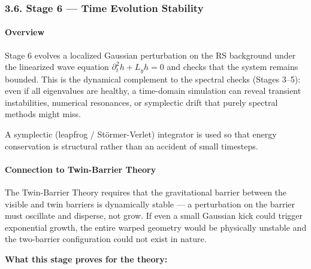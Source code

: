 \documentclass[
  11pt,
]{article}
\begin{document}
\bigskip

\hypertarget{stage-6-time-evolution-stability}{%
\subsubsection{3.6. Stage 6 --- Time Evolution
Stability}\label{stage-6-time-evolution-stability}}

\hypertarget{overview-5}{%
\paragraph{Overview}\label{overview-5}}

Stage 6 evolves a localized Gaussian perturbation on the RS background
under the linearized wave equation \(\partial_t^2 h + L_y h = 0\) and
checks that the system remains bounded. This is the dynamical complement
to the spectral checks (Stages 3--5): even if all eigenvalues are
healthy, a time-domain simulation can reveal transient instabilities,
numerical resonances, or symplectic drift that purely spectral methods
might miss.

A symplectic (leapfrog / Störmer-Verlet) integrator is used so that
energy conservation is structural rather than an accident of small
timesteps.

\bigskip

\hypertarget{connection-to-twin-barrier-theory-5}{%
\paragraph{Connection to Twin-Barrier
Theory}\label{connection-to-twin-barrier-theory-5}}

The Twin-Barrier Theory requires that the gravitational barrier between
the visible and twin barriers is dynamically stable --- a perturbation
on the barrier must oscillate and disperse, not grow. If even a small
Gaussian kick could trigger exponential growth, the entire warped
geometry would be physically unstable and the two-barrier configuration
could not exist in nature.

\textbf{What this stage proves for the theory:}
\end{document}
